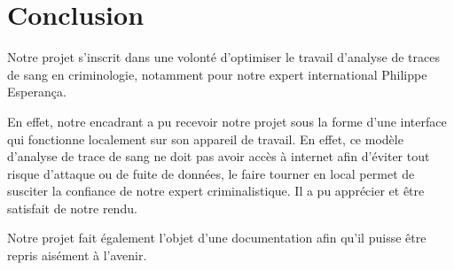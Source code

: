 \documentclass[a4paper]{article}
\begin{document}
\section{Conclusion}

Notre projet s'inscrit dans une volonté d'optimiser le travail d'analyse de traces de sang en criminologie, notamment pour notre expert international Philippe Esperança. 

En effet, notre encadrant a pu recevoir notre projet sous la forme d'une interface qui fonctionne localement sur son appareil de travail. En effet, ce modèle d'analyse de trace de sang ne doit pas avoir accès à internet afin d'éviter tout risque d'attaque ou de fuite de données, le faire tourner en local permet de susciter la confiance de notre expert criminalistique. Il a pu apprécier et être satisfait de notre rendu.

Notre projet fait également l'objet d'une documentation afin qu'il puisse être repris aisément à l'avenir. 

\printbibliography
\end{document}
